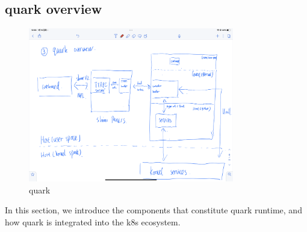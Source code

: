 \subsection{quark overview}


\begin{figure}[H]
    \centering
    \includegraphics[width=0.8\textwidth]{images/IMG_4415.PNG}
    \caption[quark]{quark}
    \label{fig:quark}
\end{figure}
In this section, we introduce the components that constitute quark runtime, and how quark is integrated into the k8s ecosystem.

